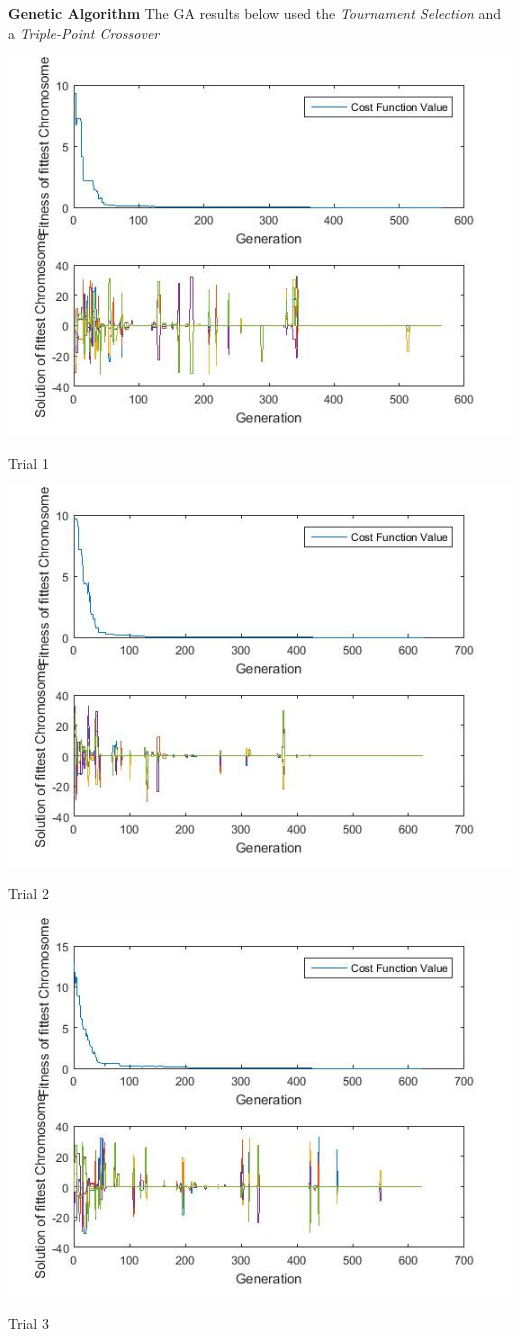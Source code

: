 \documentclass{article}
\begin{document}
\textbf{Genetic Algorithm} The GA results below used the \textit{Tournament Selection} and a \textit{Triple-Point Crossover}\\
\centerline{\includegraphics[width=0.5\linewidth]{ga_tf5_s1_c2a}}
\centerline{Trial 1}
\centerline{\includegraphics[width=0.5\linewidth]{ga_tf5_s1_c2b}}
\centerline{Trial 2}
\centerline{\includegraphics[width=0.5\linewidth]{ga_tf5_s1_c2c}}
\centerline{Trial 3}
\end{document}
